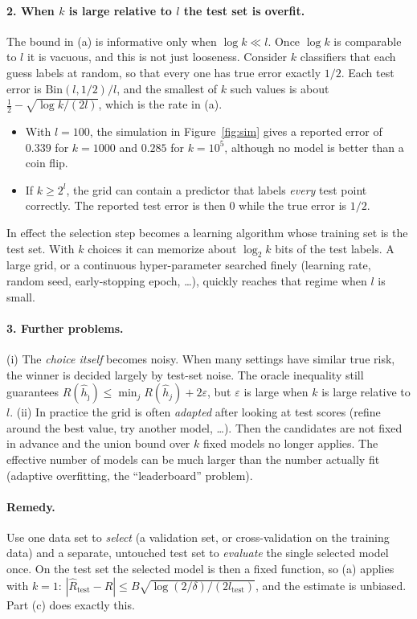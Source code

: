 \documentclass[11pt]{article}
\begin{document}
\paragraph{2. When $k$ is large relative to $l$ the test set is overfit.}
The bound in (a) is informative only when $\log k\ll l$. Once $\log k$ is comparable to $l$ it is
vacuous, and this is not just looseness. Consider $k$ classifiers that each guess labels at random,
so that every one has true error exactly $1/2$. Each test error is $\mathrm{Bin}(l,1/2)/l$, and the
smallest of $k$ such values is about $\tfrac12-\sqrt{\log k/(2l)}$, which is the rate in (a).
\begin{itemize}
\item With $l=100$, the simulation in Figure~\ref{fig:sim} gives a reported error of
$\mathbf{0.339}$ for $k=1000$ and $\mathbf{0.285}$ for $k=10^5$, although no model is better
than a coin flip.
\item If $k\ge2^l$, the grid can contain a predictor that labels \emph{every} test point correctly.
The reported test error is then $0$ while the true error is $1/2$.
\end{itemize}
In effect the selection step becomes a learning algorithm whose training set is the test set. With
$k$ choices it can memorize about $\log_2k$ bits of the test labels. A large grid, or a continuous
hyper-parameter searched finely (learning rate, random seed, early-stopping epoch, \dots), quickly
reaches that regime when $l$ is small.

\paragraph{3. Further problems.}
(i) The \emph{choice itself} becomes noisy. When many settings have similar true risk, the winner
is decided largely by test-set noise. The oracle inequality still guarantees
$R(\hat h_{\hat\jmath})\le\min_jR(\hat h_j)+2\varepsilon$, but $\varepsilon$ is large when $k$ is
large relative to $l$. (ii) In practice the grid is often \emph{adapted} after looking at test
scores (refine around the best value, try another model, \dots). Then the candidates are not fixed
in advance and the union bound over $k$ fixed models no longer applies. The effective number of
models can be much larger than the number actually fit (adaptive overfitting, the ``leaderboard''
problem).

\paragraph{Remedy.} Use one data set to \emph{select} (a validation set, or cross-validation on the
training data) and a separate, untouched test set to \emph{evaluate} the single selected model once.
On the test set the selected model is then a fixed function, so (a) applies with $k=1$:
$|\widehat R_{\text{test}}-R|\le B\sqrt{\log(2/\delta)/(2l_{\text{test}})}$, and the estimate is
unbiased. Part (c) does exactly this.
\end{document}
